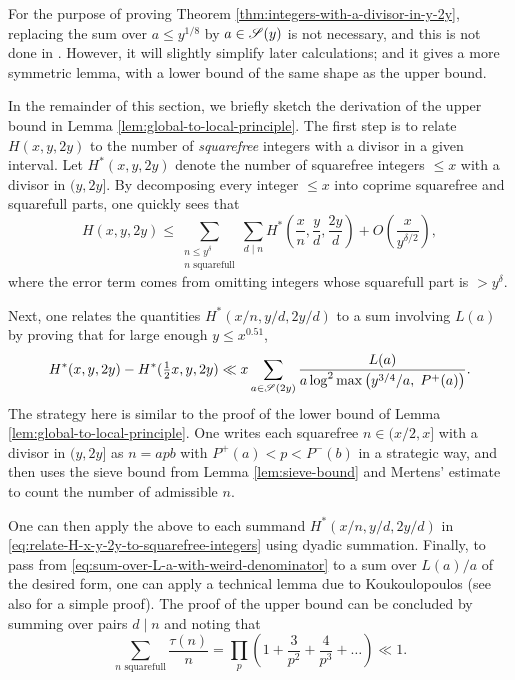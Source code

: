 \begin{remark}
    For the purpose of proving Theorem \ref{thm:integers-with-a-divisor-in-y-2y}, replacing the sum over $a \le y^{1/8}$ by $a \in \mathscr{S}(y)$ is not necessary, and this is not done in \cite{integerswithadivisor}. 
    However, it will slightly simplify later calculations; and it gives a more symmetric lemma, with a lower bound of the same shape as the upper bound.
\end{remark}

In the remainder of this section, we briefly sketch the derivation of the upper bound in Lemma \ref{lem:global-to-local-principle}.
The first step is to relate $H(x, y, 2y)$ to the number of \textit{squarefree} integers with a divisor in a given interval.
Let $H^*(x, y, 2y)$ denote the number of squarefree integers $\le x$ with a divisor in $(y, 2y]$.
By decomposing every integer $\le x$ into coprime squarefree and squarefull parts, one quickly sees that
\begin{equation} \label{eq:relate-H-x-y-2y-to-squarefree-integers}
    H(x, y, 2y) \le \sum\limits_{\substack{n \le y^\delta\\ n \text{ squarefull}}} \sum \limits_{d \mid n} H^*\left( \frac{x}{n}, \frac{y}{d}, \frac{2y}{d} \right) + O\left( \frac{x}{y^{\delta/2}} \right),
\end{equation}
where the error term comes from omitting integers whose squarefull part is $> y^\delta$.

Next, one relates the quantities $H^*(x / n, y/d, 2y/d)$ to a sum involving $L(a)$ by proving that for large enough $y \le x^{0.51}$,
\begin{equation} \label{eq:sum-over-L-a-with-weird-denominator}
    H^*(x, y, 2y) - H^{*}({\textstyle \frac{1}{2}}x, y, 2y) \ll x \sum \limits_{a \in \mathscr{S}(2y)} \frac{L(a)}{a \log^2 \max\left(y^{3/4}/a,\; P^+(a)\right)}.
\end{equation}
The strategy here is similar to the proof of the lower bound of Lemma \ref{lem:global-to-local-principle}. One writes each squarefree $n \in (x/2, x]$ with a divisor in $(y, 2y]$ as $n = apb$ with $P^+(a) < p < P^-(b)$ in a strategic way, and then uses the sieve bound from Lemma \ref{lem:sieve-bound} and Mertens' estimate to count the number of admissible $n$.

One can then apply the above to each summand $H^*(x / n, y/d, 2y/d)$ in \eqref{eq:relate-H-x-y-2y-to-squarefree-integers} using dyadic summation. 
Finally, to pass from \eqref{eq:sum-over-L-a-with-weird-denominator} to a sum over $L(a)/a$ of the desired form, one can apply a technical lemma due to Koukoulopoulos \cite[Lemma 2.2 (b)]{localizedfactorizationsofintegers} (see also \cite{integerswithadivisor} for a simple proof).
The proof of the upper bound can be concluded by summing over pairs $d \mid n$ and noting that 
\begin{equation*}
    \sum \limits_{n \text{ squarefull}} \frac{\tau(n)}{n} = \prod\limits_{p} \left(1 + \frac{3}{p^2} + \frac{4}{p^3} + \dots  \right) \ll 1.
\end{equation*}

